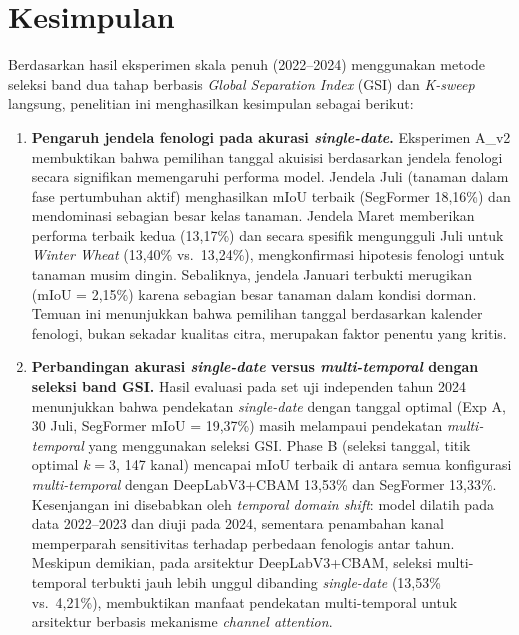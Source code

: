 
\section{Kesimpulan}

Berdasarkan hasil eksperimen skala penuh (2022--2024) menggunakan metode seleksi band dua tahap berbasis \textit{Global Separation Index} (GSI) dan \textit{K-sweep} langsung, penelitian ini menghasilkan kesimpulan sebagai berikut:

\begin{enumerate}

    \item \textbf{Pengaruh jendela fenologi pada akurasi \textit{single-date}.}
    Eksperimen A\_v2 membuktikan bahwa pemilihan tanggal akuisisi berdasarkan jendela fenologi secara signifikan memengaruhi performa model. Jendela Juli (tanaman dalam fase pertumbuhan aktif) menghasilkan mIoU terbaik (SegFormer 18,16\%) dan mendominasi sebagian besar kelas tanaman. Jendela Maret memberikan performa terbaik kedua (13,17\%) dan secara spesifik mengungguli Juli untuk \textit{Winter Wheat} (13,40\% vs.\ 13,24\%), mengkonfirmasi hipotesis fenologi untuk tanaman musim dingin. Sebaliknya, jendela Januari terbukti merugikan (mIoU = 2,15\%) karena sebagian besar tanaman dalam kondisi dorman. Temuan ini menunjukkan bahwa pemilihan tanggal berdasarkan kalender fenologi, bukan sekadar kualitas citra, merupakan faktor penentu yang kritis.

    \item \textbf{Perbandingan akurasi \textit{single-date} versus \textit{multi-temporal} dengan seleksi band GSI.}
    Hasil evaluasi pada set uji independen tahun 2024 menunjukkan bahwa pendekatan \textit{single-date} dengan tanggal optimal (Exp A, 30 Juli, SegFormer mIoU = 19,37\%) masih melampaui pendekatan \textit{multi-temporal} yang menggunakan seleksi GSI. Phase B (seleksi tanggal, titik optimal $k=3$, 147 kanal) mencapai mIoU terbaik di antara semua konfigurasi \textit{multi-temporal} dengan DeepLabV3+CBAM 13,53\% dan SegFormer 13,33\%. Kesenjangan ini disebabkan oleh \textit{temporal domain shift}: model dilatih pada data 2022--2023 dan diuji pada 2024, sementara penambahan kanal memperparah sensitivitas terhadap perbedaan fenologis antar tahun. Meskipun demikian, pada arsitektur DeepLabV3+CBAM, seleksi multi-temporal terbukti jauh lebih unggul dibanding \textit{single-date} (13,53\% vs.\ 4,21\%), membuktikan manfaat pendekatan multi-temporal untuk arsitektur berbasis mekanisme \textit{channel attention}.


\end{enumerate}
